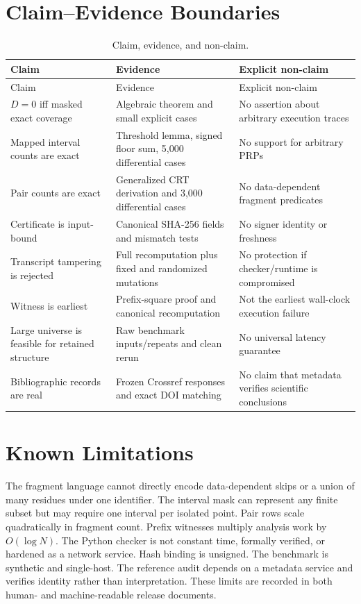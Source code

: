 \documentclass[11pt,onecolumn]{IEEEtran}
\begin{document}
\section{Claim--Evidence Boundaries}
\begin{longtable}{@{}p{}p{}p{}@{}}
\caption{Claim, evidence, and non-claim.}\label{tab:claims}\\
\toprule
Claim & Evidence & Explicit non-claim \\
\midrule
\endfirsthead
\toprule
Claim & Evidence & Explicit non-claim \\
\midrule
\endhead
$D=0$ iff masked exact coverage & Algebraic theorem and small explicit cases & No assertion about arbitrary execution traces \\
Mapped interval counts are exact & Threshold lemma, signed floor sum, 5,000 differential cases & No support for arbitrary PRPs \\
Pair counts are exact & Generalized CRT derivation and 3,000 differential cases & No data-dependent fragment predicates \\
Certificate is input-bound & Canonical SHA-256 fields and mismatch tests & No signer identity or freshness \\
Transcript tampering is rejected & Full recomputation plus fixed and randomized mutations & No protection if checker/runtime is compromised \\
Witness is earliest & Prefix-square proof and canonical recomputation & Not the earliest wall-clock execution failure \\
Large universe is feasible for retained structure & Raw benchmark inputs/repeats and clean rerun & No universal latency guarantee \\
Bibliographic records are real & Frozen Crossref responses and exact DOI matching & No claim that metadata verifies scientific conclusions \\
\bottomrule
\end{longtable}

\section{Known Limitations}
The fragment language cannot directly encode data-dependent skips or a union of many residues under one identifier.  The interval mask can represent any finite subset but may require one interval per isolated point.  Pair rows scale quadratically in fragment count.  Prefix witnesses multiply analysis work by $O(\log N)$.  The Python checker is not constant time, formally verified, or hardened as a network service.  Hash binding is unsigned.  The benchmark is synthetic and single-host.  The reference audit depends on a metadata service and verifies identity rather than interpretation.  These limits are recorded in both human- and machine-readable release documents.
\end{document}
